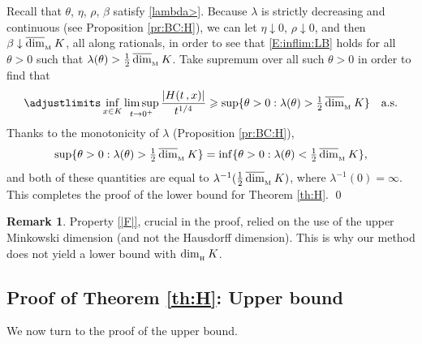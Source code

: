 \documentclass[reqno]{amsart}
\DeclareMathOperator{\dimh}{dim_{_{\rm H}}}
\DeclareMathOperator{\dimm}{\overline{dim}_{_{\rm M}}}
\newcommand{\<}{\langle}
\renewcommand{\>}{\rangle}
\newcommand{\1}{\mathbb{1}}
\renewcommand{\ge}{\geqslant}
\theoremstyle{definition}
\newtheorem{remark}[stat]{Remark}
\numberwithin{equation}{section}
\begin{document}
Recall that $\theta$, $\eta$, $\rho$, $\beta$ satisfy \eqref{lambda>}.
Because $\lambda$ is strictly decreasing and continuous 
(see Proposition \ref{pr:BC:H}), we can let $\eta \downarrow 0$, 
$\rho \downarrow 0$, and then $\beta \downarrow \dimm K$, all along rationals, in order
to see that
\eqref{E:inflim:LB} holds for all $\theta>0$ such that $\lambda(\theta)>\tfrac12\dimm K$.
Take supremum over all such $\theta>0$ in order to find that
\[
	\adjustlimits\inf_{x\in K}\limsup_{t \to 0^+} 
	\frac{|H(t\,,x)|}{t^{1/4}} \ge \sup\{\theta>0: 
	\lambda(\theta) > \tfrac12 \dimm K\}
	\quad\text{a.s.}
\]
Thanks to the monotonicity of $\lambda$ (Proposition \ref{pr:BC:H}),
\[
	\sup\{\theta>0: \lambda(\theta) > \tfrac12 \dimm K\}
	=\inf\{\theta>0: \lambda(\theta) < \tfrac12 \dimm K\},
\]
and both of these quantities are equal to $\lambda^{-1}(\frac12\dimm K)$,
where $\lambda^{-1}(0)=\infty$.
This completes the proof of the lower bound for Theorem \ref{th:H}.
\qed

\begin{remark}
	Property \ref{|F|}, crucial in the proof,
	relied on the use of the upper Minkowski dimension
	(and not the Hausdorff dimension).
	This is why our method does not yield a lower bound with $\dimh K$.
\end{remark}

\subsection{Proof of Theorem \ref{th:H}: Upper bound}\label{s:th:H:ub}

We now turn to the proof of the upper bound.
\end{document}
